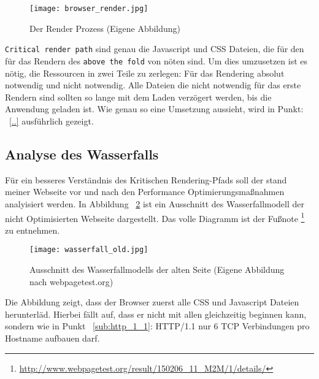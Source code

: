 		\begin{figure}[htbp]
			\begin{center}
				\texttt{[image: browser\_render.jpg]}
				\caption{Der Render Prozess (Eigene Abbildung)}
				\label{fig:browser_render}
			\end{center}
		\end{figure}
	
		\texttt{Critical render path} sind genau die Javascript und CSS Dateien, die für den für das Rendern des \texttt{above the fold} von nöten sind. Um dies umzusetzen ist es nötig, die Ressourcen in zwei Teile zu zerlegen: Für das Rendering absolut notwendig und nicht notwendig. Alle Dateien die nicht notwendig für das erste Rendern sind sollten so lange mit dem Laden verzögert werden, bis die Anwendung geladen ist. Wie genau so eine Umsetzung aussieht, wird in Punkt: ~\ref{..} ausführlich gezeigt.



	\subsection{Analyse des Wasserfalls}
	\label{sub:analyse_des_wasserfalls}
		Für ein besseres Verständnis des Kritischen Rendering-Pfads soll der stand meiner Webseite vor und nach den Performance Optimierungsmaßnahmen analyisiert werden. In Abbildung ~\ref{fig:wasserfall_old} ist ein Ausschnitt des Wasserfallmodell der nicht Optimisierten Webseite dargestellt. Das volle Diagramm ist der Fußnote \footnote{\url{http://www.webpagetest.org/result/150206_11_M2M/1/details/}} zu entnehmen.

		\begin{figure}[htbp]
			\begin{center}
				\texttt{[image: wasserfall\_old.jpg]}
				\caption{Ausschnitt des Wasserfallmodells der alten Seite (Eigene Abbildung nach webpagetest.org)}
				\label{fig:wasserfall_old}
			\end{center}
		\end{figure}
		
	  Die Abbildung zeigt, dass der Browser zuerst alle CSS und Javascript Dateien herunterläd. Hierbei fällt auf, dass er nicht mit allen gleichzeitig beginnen kann, sondern wie in Punkt ~\ref{sub:http_1_1}: HTTP/1.1 nur 6 TCP Verbindungen pro Hostname aufbauen darf. 





\pagebreak
